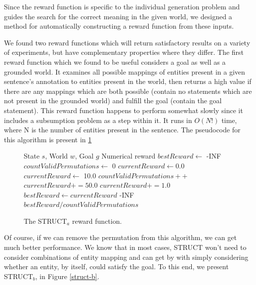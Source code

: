 Since the reward function is specific to the individual generation
problem and guides the search for the correct meaning in the
given world, we designed a method for automatically constructing
a reward function from these inputs.
 
We found two reward functions which will
 return satisfactory results on a variety of experiments, but have complementary
properties where they differ.  The first reward function
 which we found to be useful considers a goal as well as a 
 grounded world.  It examines all possible mappings of entities present in
 a given sentence's annotation to entities present in the world, then returns
 a high value if there are any mappings which are both possible (contain no statements
 which are not present in the grounded world) and fulfill the goal (contain the
 goal statement).  This reward function happens to perform somewhat slowly since it includes
a subsumption problem as a step within it.  It runs in $O(N!)$ time, where
N is the number of entities present in the sentence.  The pseudocode for this algorithm
is present in \ref{struct-a}

\begin{figure}
\caption{The STRUCT$_a$ reward function.}\label{struct-a}
\begin{algorithmic}[1]
\REQUIRE State $s$, World $w$, Goal $g$
\ENSURE Numerical reward
\STATE $bestReward \gets$ -INF
\STATE $countValidPermutations \gets$ 0
	\STATE $currentReward \gets 0.0$
		\STATE $currentReward \gets$ 10.0
		\STATE $countValidPermutations++$
	\ENDIF
		\STATE $currentReward += 50.0$
	\ENDIF
			\STATE $currentReward += 1.0$
		\ENDIF
	\ENDFOR
		\STATE $bestReward \gets currentReward$
	\ENDIF
\ENDFOR
{}
	\RETURN -INF
\ENDIF
\RETURN $bestReward / countValidPermutations$
\end{algorithmic}
\end{figure}

Of course, if we can remove the permutation from this algorithm,
we can get much better performance.  We know that in most cases,
STRUCT won't need to consider combinations of entity mapping and
can get by with simply considering whether an entity, by itself, could
satisfy the goal.  To this end, we present STRUCT$_b$, in Figure \ref{struct-b}.

